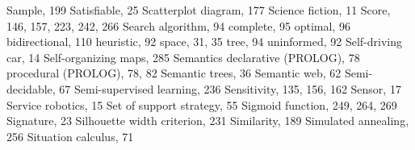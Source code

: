 \documentclass[10pt]{book}
\begin{document}
Sample, 199
Satisfiable, 25
Scatterplot diagram, 177
Science fiction, 11
Score, 146, 157, 223, 242, 266
Search
algorithm, 94
complete, 95
optimal, 96
bidirectional, 110
heuristic, 92
space, 31, 35
tree, 94
uninformed, 92
Self-driving car, 14
Self-organizing maps, 285
Semantics
declarative (PROLOG), 78
procedural (PROLOG), 78, 82
Semantic trees, 36
Semantic web, 62
Semi-decidable, 67
Semi-supervised learning, 236
Sensitivity, 135, 156, 162
Sensor, 17
Service robotics, 15
Set of support strategy, 55
Sigmoid function, 249, 264, 269
Signature, 23
Silhouette width criterion, 231
Similarity, 189
Simulated annealing, 256
Situation calculus, 71

\makeindex
\printindex


\end{document}
